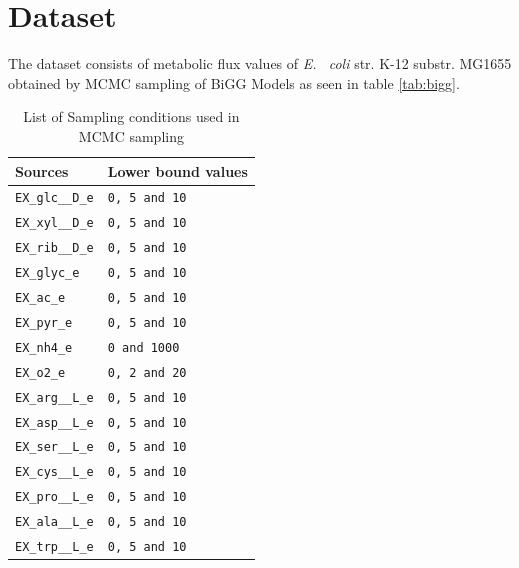 \documentclass[12pt,chapterheads]{ucsd}
\begin{document}
\chapter{Dataset}

The dataset consists of metabolic flux values of \textit{E. ~coli} str. K-12 substr. MG1655 \cite{Blattner1453} obtained by MCMC sampling of BiGG Models as seen in table \ref{tab:bigg}. 

\vspace{0.25in}
\begin{table}[!ht]
\caption[Sampling conditions]{List of Sampling conditions used in MCMC sampling}

\vspace{-0.25in}
\begin{center}
\begin{tabular}{|p{1.2in}|p{1.4in}|}
\hline
Sources  & Lower bound values\\
\hline
\verb|EX_glc__D_e| & \verb|0, 5 and 10| \\
\hline
\verb|EX_xyl__D_e| &  \verb|0, 5 and 10| \\
\hline
\verb|EX_rib__D_e| &  \verb|0, 5 and 10| \\
\hline
\verb|EX_glyc_e| &  \verb|0, 5 and 10| \\
\hline
\verb|EX_ac_e| &  \verb|0, 5 and 10| \\
\hline
\verb|EX_pyr_e| &  \verb|0, 5 and 10| \\
\hline
\verb|EX_nh4_e| &  \verb|0 and 1000| \\
\hline
\verb|EX_o2_e| &  \verb|0, 2 and 20| \\
\hline
\verb|EX_arg__L_e| &  \verb|0, 5 and 10| \\
\hline
\verb|EX_asp__L_e| &  \verb|0, 5 and 10| \\
\hline
\verb|EX_ser__L_e| &  \verb|0, 5 and 10| \\
\hline
\verb|EX_cys__L_e| &  \verb|0, 5 and 10| \\
\hline
\verb|EX_pro__L_e| &  \verb|0, 5 and 10| \\
\hline
\verb|EX_ala__L_e| &  \verb|0, 5 and 10| \\
\hline
\verb|EX_trp__L_e| &  \verb|0, 5 and 10| \\
\hline

\end{tabular}
\end{center}
\label{tab:sampling}
\end{table}
\end{document}
